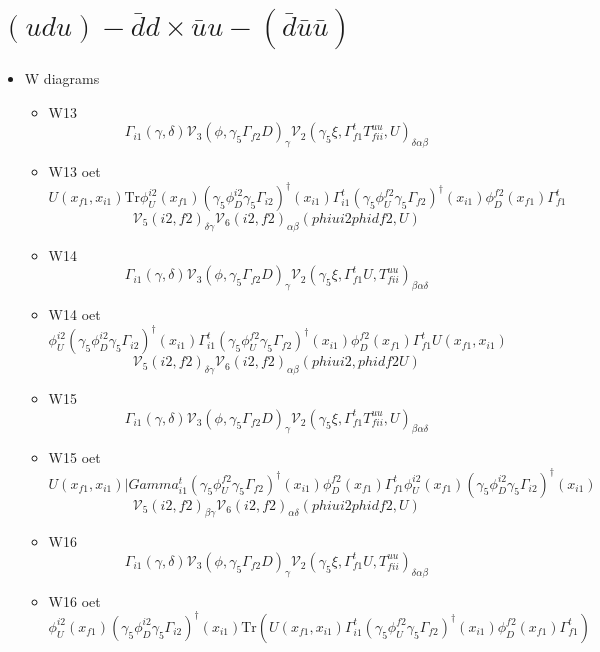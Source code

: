 \documentclass{article}[12pt]
\begin{document}
\section{$(udu)-\bar{d}d \times \bar{u}u-(\bar{d}\bar{u}\bar{u}) $}
\begin{itemize}
\item W diagrams
\begin{itemize}
\item W13
$$
\Gamma_{i1}\left(\gamma,\delta\right){\mathcal V}_3\left(\phi,\gamma_5\Gamma_{f2}D\right)_{\gamma}
{\mathcal V}_2\left(\gamma_5\xi,\Gamma_{f1}^tT^{uu}_{fii},U\right)_{\delta\alpha\beta}
$$
\item W13 oet
$$
U(x_{f1},x_{i1})\mathrm{Tr}\phi_U^{i2}(x_{f1})
(\gamma_5\phi_D^{i2}\gamma_5\Gamma_{i2})^{\dagger}(x_{i1})
\Gamma_{i1}^t(\gamma_5\phi_U^{f2}\gamma_5\Gamma_{f2})^{\dagger}(x_{i1})\phi_D^{f2}(x_{f1})\Gamma_{f1}^t
$$
$$
{\mathcal V}_5(i2,f2)_{\delta\gamma}{\mathcal V}_6(i2,f2)_{\alpha\beta}(phiui2phidf2,U)
$$
\item W14
$$
\Gamma_{i1}\left(\gamma,\delta\right){\mathcal V}_3\left(\phi,\gamma_5\Gamma_{f2}D\right)_{\gamma}
{\mathcal V}_2\left(\gamma_5\xi,\Gamma_{f1}^tU,T^{uu}_{fii}\right)_{\beta\alpha\delta}
$$
\item W14 oet
$$
\phi_U^{i2}(\gamma_5\phi_D^{i2}\gamma_5\Gamma_{i2})^{\dagger}(x_{i1})\Gamma_{i1}^t(\gamma_5\phi_U^{f2}\gamma_5\Gamma_{f2})^{\dagger}(x_{i1})\phi_D^{f2}(x_{f1})\Gamma_{f1}^tU(x_{f1},x_{i1})
$$
$$
{\mathcal V}_5(i2,f2)_{\delta\gamma}{\mathcal V}_6(i2,f2)_{\alpha\beta}(phiui2,phidf2U)
$$
\item W15
$$
\Gamma_{i1}\left(\gamma,\delta\right){\mathcal V}_3\left(\phi,\gamma_5\Gamma_{f2}D\right)_{\gamma}
{\mathcal V}_2\left(\gamma_5\xi,\Gamma_{f1}^tT^{uu}_{fii},U\right)_{\beta\alpha\delta}
$$
\item W15 oet
$$
U(x_{f1},x_{i1})|Gamma_{i1}^t(\gamma_5\phi_U^{f2}\gamma_5\Gamma_{f2})^{\dagger}(x_{i1})\phi_D^{f2}(x_{f1})\Gamma_{f1}^t\phi_U^{i2}(x_{f1})(\gamma_5\phi_D^{i2}\gamma_5\Gamma_{i2})^{\dagger}(x_{i1})
$$
$$
{\mathcal V}_5(i2,f2)_{\beta\gamma}{\mathcal V}_6(i2,f2)_{\alpha\delta}(phiui2phidf2,U)
$$
\item W16
$$
\Gamma_{i1}\left(\gamma,\delta\right){\mathcal V}_3\left(\phi,\gamma_5\Gamma_{f2}D\right)_{\gamma}
{\mathcal V}_2\left(\gamma_5\xi,\Gamma_{f1}^tU,T^{uu}_{fii}\right)_{\delta\alpha\beta}
$$
\item W16 oet
$$
\phi_U^{i2}(x_{f1})(\gamma_5\phi_D^{i2}\gamma_5\Gamma_{i2})^{\dagger}(x_{i1})\mathrm{Tr}(U(x_{f1},x_{i1})\Gamma_{i1}^t(\gamma_5\phi_U^{f2}\gamma_5\Gamma_{f2})^{\dagger}(x_{i1})\phi_D^{f2}(x_{f1})\Gamma_{f1}^t)
$$
\end{itemize}
\end{itemize}
\end{document}
